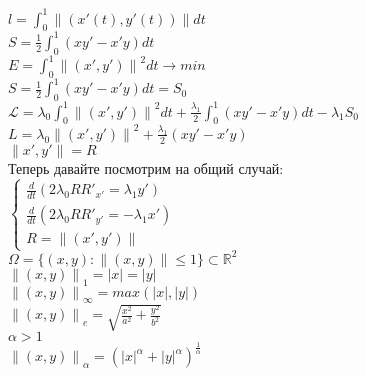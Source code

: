 \documentclass{article}
\newcommand\0{\mathbb{0}}
\newcommand\1{\mathbb{1}}
\newcommand{\norm}[1]{\left\lVert#1\right\rVert}
\begin{document}
$l = \displaystyle\int_0^1 \norm{(x'(t), y'(t))}dt$\\
$S = \frac{1}{2}\displaystyle\int_0^1 (xy' - x'y)dt$\\
$E = \displaystyle\int_0^1 \norm{(x', y')}^2 dt \to min$\\
$S = \frac{1}{2}\displaystyle\int_0^1 (xy' - x'y)dt = S_0$\\
$\mathcal{L} = \lambda_0 \displaystyle\int_0^1 \norm{(x', y')}^2dt + \frac{\lambda_1}{2}\displaystyle\int_0^1(xy' - x'y)dt - \lambda_1 S_0$\\
$L = \lambda_0 \norm{(x', y')}^2 + \frac{\lambda_1}{2}(xy' - x'y)$\\
$\norm{x', y'} = R$\\
Теперь давайте посмотрим на общий случай:\\
$\begin{cases}
    \frac{d}{dt}(2\lambda_0R R'_{x'} = \lambda_1y')\\
    \frac{d}{dt}(2\lambda_0R R'_{y'} = -\lambda_1x')\\
    R = \norm{(x', y')}
\end{cases}$\\
$\Omega = \{(x, y): \norm{(x, y)} \leq 1\} \subset \mathbb{R}^2$\\
$\norm{(x, y)}_1 = |x| = |y|$\\
$\norm{(x, y)}_\infty = max(|x|, |y|)$\\
$\norm{(x, y)}_e = \sqrt{\frac{x^2}{a^2} + \frac{y^2}{b^2}}$\\
$\alpha > 1$\\
$\norm{(x, y)}_\alpha = (|x|^\alpha + |y|^\alpha)^{\frac{1}{\alpha}}$\\
\end{document}
